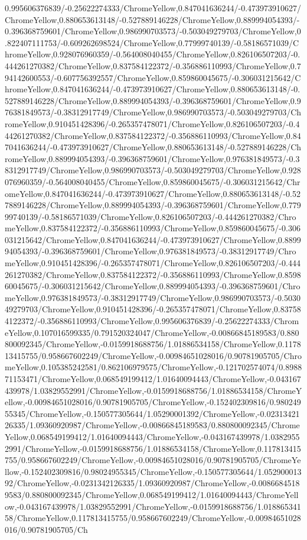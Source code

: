 {\begin{tikzternal}
{0.995606376839/-0.25622274333/ChromeYellow,0.847041636244/-0.473973910627/ChromeYellow,0.880653613148/-0.527889146228/ChromeYellow,0.889994054393/-0.396368759601/ChromeYellow,0.986990703573/-0.503049279703/ChromeYellow,0.822407111753/-0.609262698524/ChromeYellow,0.77999740139/-0.58186571039/ChromeYellow,0.928076960359/-0.564008040455/ChromeYellow,0.826106507203/-0.444261270382/ChromeYellow,0.837584122372/-0.356886110993/ChromeYellow,0.794142600553/-0.607756392557/ChromeYellow,0.859860045675/-0.306031215642/ChromeYellow,0.847041636244/-0.473973910627/ChromeYellow,0.880653613148/-0.527889146228/ChromeYellow,0.889994054393/-0.396368759601/ChromeYellow,0.976381849573/-0.38312917749/ChromeYellow,0.986990703573/-0.503049279703/ChromeYellow,0.910451428396/-0.265357478071/ChromeYellow,0.826106507203/-0.444261270382/ChromeYellow,0.837584122372/-0.356886110993/ChromeYellow,0.847041636244/-0.473973910627/ChromeYellow,0.880653613148/-0.527889146228/ChromeYellow,0.889994054393/-0.396368759601/ChromeYellow,0.976381849573/-0.38312917749/ChromeYellow,0.986990703573/-0.503049279703/ChromeYellow,0.928076960359/-0.564008040455/ChromeYellow,0.859860045675/-0.306031215642/ChromeYellow,0.847041636244/-0.473973910627/ChromeYellow,0.880653613148/-0.527889146228/ChromeYellow,0.889994054393/-0.396368759601/ChromeYellow,0.77999740139/-0.58186571039/ChromeYellow,0.826106507203/-0.444261270382/ChromeYellow,0.837584122372/-0.356886110993/ChromeYellow,0.859860045675/-0.306031215642/ChromeYellow,0.847041636244/-0.473973910627/ChromeYellow,0.889994054393/-0.396368759601/ChromeYellow,0.976381849573/-0.38312917749/ChromeYellow,0.910451428396/-0.265357478071/ChromeYellow,0.826106507203/-0.444261270382/ChromeYellow,0.837584122372/-0.356886110993/ChromeYellow,0.859860045675/-0.306031215642/ChromeYellow,0.889994054393/-0.396368759601/ChromeYellow,0.976381849573/-0.38312917749/ChromeYellow,0.986990703573/-0.503049279703/ChromeYellow,0.910451428396/-0.265357478071/ChromeYellow,0.837584122372/-0.356886110993/ChromeYellow,0.995606376839/-0.25622274333/ChromeYellow,0.107016599335/0.791520324047/ChromeYellow,-0.00866845189583/0.880800092345/ChromeYellow,-0.0159918688756/1.01886534158/ChromeYellow,0.117813415755/0.958667602249/ChromeYellow,-0.00984651028016/0.90781905705/ChromeYellow,0.105385242581/0.862106979575/ChromeYellow,-0.121702574074/0.898871153471/ChromeYellow,0.068549199412/1.01640094443/ChromeYellow,-0.043167439978/1.03829552991/ChromeYellow,-0.0159918688756/1.01886534158/ChromeYellow,-0.00984651028016/0.90781905705/ChromeYellow,-0.152402309816/0.98024955345/ChromeYellow,-0.150577305644/1.05290001392/ChromeYellow,-0.0231342126335/1.09360920987/ChromeYellow,-0.00866845189583/0.880800092345/ChromeYellow,0.068549199412/1.01640094443/ChromeYellow,-0.043167439978/1.03829552991/ChromeYellow,-0.0159918688756/1.01886534158/ChromeYellow,0.117813415755/0.958667602249/ChromeYellow,-0.00984651028016/0.90781905705/ChromeYellow,-0.152402309816/0.98024955345/ChromeYellow,-0.150577305644/1.05290001392/ChromeYellow,-0.0231342126335/1.09360920987/ChromeYellow,-0.00866845189583/0.880800092345/ChromeYellow,0.068549199412/1.01640094443/ChromeYellow,-0.043167439978/1.03829552991/ChromeYellow,-0.0159918688756/1.01886534158/ChromeYellow,0.117813415755/0.958667602249/ChromeYellow,-0.00984651028016/0.90781905705/Ch}
\end{tikzternal}}
